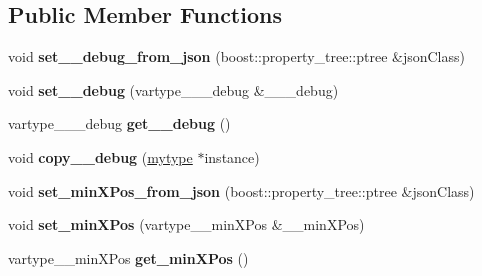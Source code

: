 \subsection*{Public Member Functions}
\begin{DoxyCompactItemize}
\item 
\mbox{\label{classfilter_1_1_algos_1_1_i_d_plate_identifier_abe8d1115a3baf8dc7de4f7281bfd11ff}} 
void {\bfseries set\+\_\+\+\_\+debug\+\_\+from\+\_\+json} (boost\+::property\+\_\+tree\+::ptree \&json\+Class)
\item 
\mbox{\label{classfilter_1_1_algos_1_1_i_d_plate_identifier_a956dc97af1dc492118f33c77cb4df76c}} 
void {\bfseries set\+\_\+\+\_\+debug} (vartype\+\_\+\+\_\+\+\_\+debug \&\+\_\+\+\_\+\+\_\+debug)
\item 
\mbox{\label{classfilter_1_1_algos_1_1_i_d_plate_identifier_a00bb26115e8c0f4e98284e6e285c210a}} 
vartype\+\_\+\+\_\+\+\_\+debug {\bfseries get\+\_\+\+\_\+debug} ()
\item 
\mbox{\label{classfilter_1_1_algos_1_1_i_d_plate_identifier_a2e62e431fa39123fe33cd16192e3d8df}} 
void {\bfseries copy\+\_\+\+\_\+debug} (\hyperlink{classfilter_1_1_algos_1_1_i_d_plate_identifier}{mytype} $\ast$instance)
\item 
\mbox{\label{classfilter_1_1_algos_1_1_i_d_plate_identifier_a33928c486cf761ce0e309c627495500d}} 
void {\bfseries set\+\_\+min\+X\+Pos\+\_\+from\+\_\+json} (boost\+::property\+\_\+tree\+::ptree \&json\+Class)
\item 
\mbox{\label{classfilter_1_1_algos_1_1_i_d_plate_identifier_a07f1dad081b2d7333c798882073161e3}} 
void {\bfseries set\+\_\+min\+X\+Pos} (vartype\+\_\+\+\_\+min\+X\+Pos \&\+\_\+\+\_\+min\+X\+Pos)
\item 
\mbox{\label{classfilter_1_1_algos_1_1_i_d_plate_identifier_ab86838092a2625a0fe1ec171905e938b}} 
vartype\+\_\+\+\_\+min\+X\+Pos {\bfseries get\+\_\+min\+X\+Pos} ()

\end{DoxyCompactItemize}
